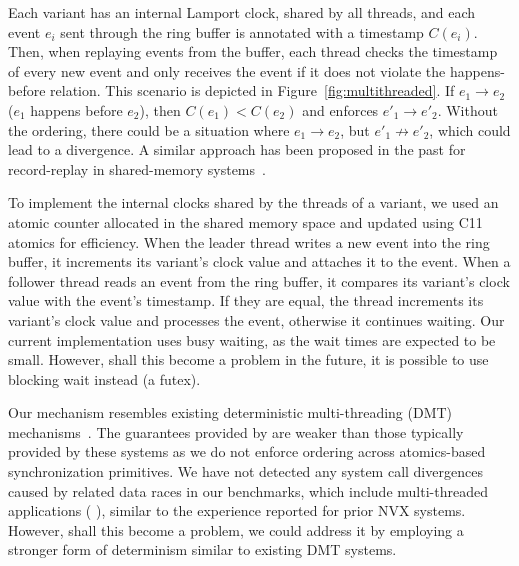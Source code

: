 Each variant has an internal Lamport clock, shared by all threads, and
each event $e_i$ sent through the ring buffer is annotated with a
timestamp $C(e_i)$.  Then, when replaying events from the buffer, each
thread checks the timestamp of every new event and only receives the
event if it does not violate the happens-before relation. This
scenario is depicted in Figure~\ref{fig:multithreaded}. If $e_1\to
e_2$ ($e_1$ happens before $e_2$), then $C(e_1)<C(e_2)$ and \varan
enforces $e'_1\to e'_2$. Without the ordering, there could be a
situation where $e_1\to e_2$, but $e'_1\not\to e'_2$, which could lead
to a divergence. A similar approach has been proposed in the past for
record-replay in shared-memory systems~\cite{levrouw94}.

To implement the internal clocks shared by the threads of a variant,
we used an atomic counter allocated in the shared memory space and
updated using C11 atomics for efficiency.  When the leader thread
writes a new event into the ring buffer, it increments its variant's
clock value and attaches it to the event.  When a follower thread
reads an event from the ring buffer, it compares its variant's clock
value with the event's timestamp.  If they are equal, the thread
increments its variant's clock value and processes the event,
otherwise it continues waiting. Our current implementation uses busy
waiting, as the wait times are expected to be small.  However, shall
this become a problem in the future, it is possible to use blocking
wait instead (\eg a futex).


Our mechanism resembles existing deterministic multi-threading (DMT)
mechanisms~\cite{coredet:asplos10,dthreads:sosp11}. The guarantees
provided by \varan are weaker than those typically provided by these
systems as we do not enforce ordering across atomics-based synchronization
primitives. We have not detected any system call divergences caused by related
data races in our benchmarks, which include multi-threaded applications (\eg
\redis), similar to the experience reported for prior NVX systems. However,
shall this become a problem, we could address it by employing a stronger form
of determinism similar to existing DMT systems.

%
%

